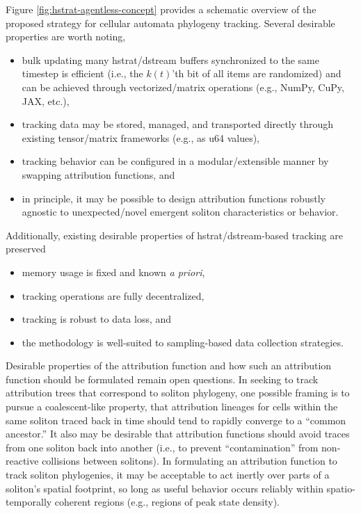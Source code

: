 Figure \ref{fig:hstrat-agentless-concept} provides a schematic overview of the proposed strategy for cellular automata phylogeny tracking.
Several desirable properties are worth noting,
\begin{itemize}
\item bulk updating many hstrat/dstream buffers synchronized to the same timestep is efficient (i.e., the $k(t)$'th bit of all items are randomized) and can be achieved through vectorized/matrix operations (e.g., NumPy, CuPy, JAX, etc.),
\item tracking data may be stored, managed, and transported directly through existing tensor/matrix frameworks (e.g., as u64 values),
\item tracking behavior can be configured in a modular/extensible manner by swapping attribution functions, and
\item in principle, it may be possible to design attribution functions robustly agnostic to unexpected/novel emergent soliton characteristics or behavior.
\end{itemize}
Additionally, existing desirable properties of hstrat/dstream-based tracking are preserved
\begin{itemize}
\item memory usage is fixed and known \textit{a priori},
\item tracking operations are fully decentralized,
\item tracking is robust to data loss, and
\item the methodology is well-suited to sampling-based data collection strategies.
\end{itemize}

Desirable properties of the attribution function and how such an attribution function should be formulated remain open questions.
In seeking to track attribution trees that correspond to soliton phylogeny, one possible framing is to pursue a coalescent-like property, that attribution lineages for cells within the same soliton traced back in time should tend to rapidly converge to a ``common ancestor.''
It also may be desirable that attribution functions should avoid traces from one soliton back into another (i.e., to prevent ``contamination'' from non-reactive collisions between solitons).
In formulating an attribution function to track soliton phylogenies, it may be acceptable to act inertly over parts of a soliton's spatial footprint, so long as useful behavior occurs reliably within spatio-temporally coherent regions (e.g., regions of peak state density).

